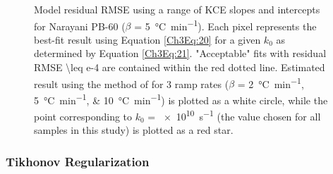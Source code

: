  \begin{figure}[t]
	\caption[Residual RMSE using a range of KCE slopes and intercepts for Narayani PB-60]{Model residual RMSE using a range of KCE slopes and intercepts for Narayani PB-60 ($\beta$ = \SI{5}{\celsius.min^{-1}}). Each pixel represents the best-fit result using Equation \ref{Ch3Eq:20} for a given $k_{0}$ as determined by Equation \ref{Ch3Eq:21}. "Acceptable" fits with residual RMSE \num{\leq e-4} are contained within the red dotted line. Estimated result using the method of \citet{Miura:1998jf} for 3 ramp rates ($\beta$ = \SIlist{2;5;10}{\celsius.min^{-1}}) is plotted as a white circle, while the point corresponding to $k_{0}$ = \SI{e10}{\s^{-1}} (the value chosen for all samples in this study) is plotted as a red star.}
	\label{Ch3Fig:5} 
\end{figure}

\subsubsection{Tikhonov Regularization}

